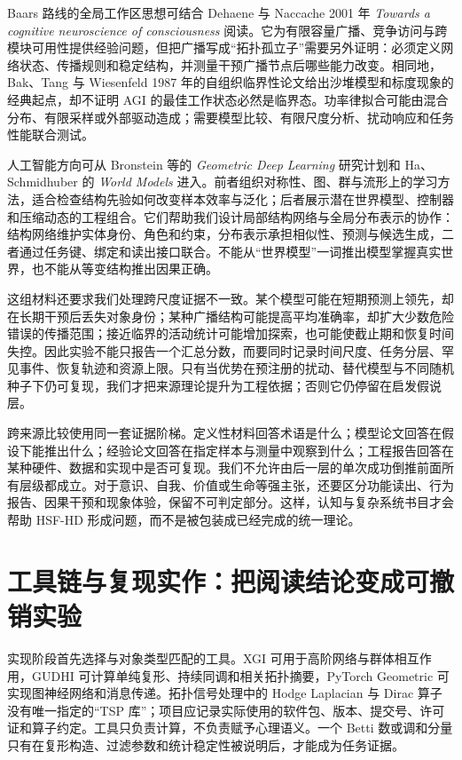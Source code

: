 Baars 路线的全局工作区思想可结合 Dehaene 与 Naccache 2001 年 \textit{Towards a cognitive neuroscience of consciousness} 阅读。它为有限容量广播、竞争访问与跨模块可用性提供经验问题，但把广播写成“拓扑孤立子”需要另外证明：必须定义网络状态、传播规则和稳定结构，并测量干预广播节点后哪些能力改变。相同地，Bak、Tang 与 Wiesenfeld 1987 年的自组织临界性论文给出沙堆模型和标度现象的经典起点，却不证明 AGI 的最佳工作状态必然是临界态。功率律拟合可能由混合分布、有限采样或外部驱动造成；需要模型比较、有限尺度分析、扰动响应和任务性能联合测试。

人工智能方向可从 Bronstein 等的 \textit{Geometric Deep Learning} 研究计划和 Ha、Schmidhuber 的 \textit{World Models} 进入。前者组织对称性、图、群与流形上的学习方法，适合检查结构先验如何改变样本效率与泛化；后者展示潜在世界模型、控制器和压缩动态的工程组合。它们帮助我们设计局部结构网络与全局分布表示的协作：结构网络维护实体身份、角色和约束，分布表示承担相似性、预测与候选生成，二者通过任务键、绑定和读出接口联合。不能从“世界模型”一词推出模型掌握真实世界，也不能从等变结构推出因果正确。

这组材料还要求我们处理跨尺度证据不一致。某个模型可能在短期预测上领先，却在长期干预后丢失对象身份；某种广播结构可能提高平均准确率，却扩大少数危险错误的传播范围；接近临界的活动统计可能增加探索，也可能使截止期和恢复时间失控。因此实验不能只报告一个汇总分数，而要同时记录时间尺度、任务分层、罕见事件、恢复轨迹和资源上限。只有当优势在预注册的扰动、替代模型与不同随机种子下仍可复现，我们才把来源理论提升为工程依据；否则它仍停留在启发假说层。

跨来源比较使用同一套证据阶梯。定义性材料回答术语是什么；模型论文回答在假设下能推出什么；经验论文回答在指定样本与测量中观察到什么；工程报告回答在某种硬件、数据和实现中是否可复现。我们不允许由后一层的单次成功倒推前面所有层级都成立。对于意识、自我、价值或生命等强主张，还要区分功能读出、行为报告、因果干预和现象体验，保留不可判定部分。这样，认知与复杂系统书目才会帮助 HSF-HD 形成问题，而不是被包装成已经完成的统一理论。

\section{工具链与复现实作：把阅读结论变成可撤销实验}

实现阶段首先选择与对象类型匹配的工具。XGI 可用于高阶网络与群体相互作用，GUDHI 可计算单纯复形、持续同调和相关拓扑摘要，PyTorch Geometric 可实现图神经网络和消息传递。拓扑信号处理中的 Hodge Laplacian 与 Dirac 算子没有唯一指定的“TSP 库”；项目应记录实际使用的软件包、版本、提交号、许可证和算子约定。工具只负责计算，不负责赋予心理语义。一个 Betti 数或调和分量只有在复形构造、过滤参数和统计稳定性被说明后，才能成为任务证据。

